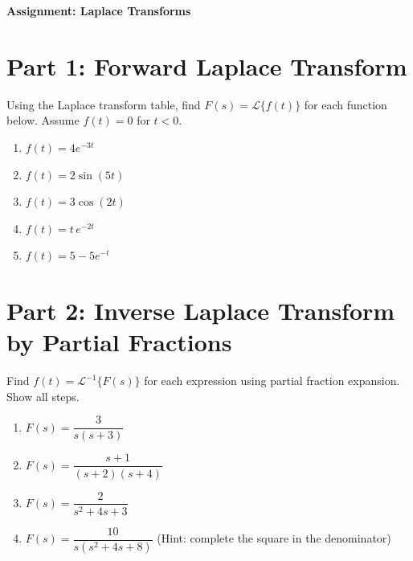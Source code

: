\documentclass[11pt]{article}
\begin{document}
\begin{center}
  \Large{\bf{Assignment: Laplace Transforms}}
\end{center}

\section*{Part 1: Forward Laplace Transform}

Using the Laplace transform table, find $F(s) = \mathcal{L}\{f(t)\}$ for each
function below.  Assume $f(t) = 0$ for $t < 0$.

\begin{enumerate}

\item $f(t) = 4e^{-3t}$

\item $f(t) = 2\sin(5t)$

\item $f(t) = 3\cos(2t)$

\item $f(t) = t\,e^{-2t}$

\item $f(t) = 5 - 5e^{-t}$

\end{enumerate}

\section*{Part 2: Inverse Laplace Transform by Partial Fractions}

Find $f(t) = \mathcal{L}^{-1}\{F(s)\}$ for each expression using partial fraction
expansion.  Show all steps.

\begin{enumerate}[resume]

\item $F(s) = \dfrac{3}{s(s+3)}$

\item $F(s) = \dfrac{s+1}{(s+2)(s+4)}$

\item $F(s) = \dfrac{2}{s^2 + 4s + 3}$

\item $F(s) = \dfrac{10}{s(s^2 + 4s + 8)}$
  \hfill (Hint: complete the square in the denominator)

\end{enumerate}
\end{document}
